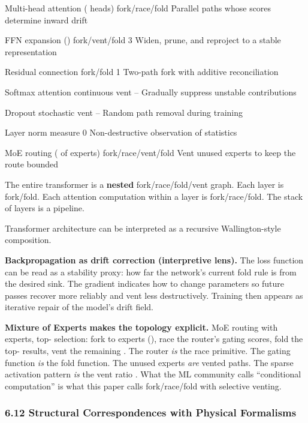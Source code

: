 \documentclass[
]{article}
\begin{document}
Multi-head attention ( heads) \textbar{} fork/race/fold \textbar{}
\textbar{} Parallel paths whose scores determine inward drift \textbar{}

FFN expansion () \textbar{} fork/vent/fold \textbar{} 3 \textbar{}
Widen, prune, and reproject to a stable representation \textbar{}

Residual connection \textbar{} fork/fold \textbar{} 1 \textbar{}
Two-path fork with additive reconciliation \textbar{}

Softmax attention \textbar{} continuous vent \textbar{} -- \textbar{}
Gradually suppress unstable contributions \textbar{}

Dropout \textbar{} stochastic vent \textbar{} -- \textbar{} Random path
removal during training \textbar{}

Layer norm \textbar{} measure \textbar{} 0 \textbar{} Non-destructive
observation of statistics \textbar{}

MoE routing ( of experts) \textbar{} fork/race/vent/fold \textbar{}
\textbar{} Vent unused experts to keep the route bounded \textbar{}

The entire transformer is a \textbf{nested} fork/race/fold/vent graph.
Each layer is fork/fold. Each attention computation within a layer is
fork/race/fold. The stack of layers is a pipeline.

Transformer architecture can be interpreted as a recursive
Wallington-style composition.

\textbf{Backpropagation as drift correction (interpretive lens).} The
loss function can be read as a stability proxy: how far the network's
current fold rule is from the desired sink. The gradient indicates how
to change parameters so future passes recover more reliably and vent
less destructively. Training then appears as iterative repair of the
model's drift field.

\textbf{Mixture of Experts makes the topology explicit.} MoE routing
with experts, top- selection: fork to experts (), race the router's
gating scores, fold the top- results, vent the remaining . The router
\emph{is} the race primitive. The gating function \emph{is} the fold
function. The unused experts \emph{are} vented paths. The sparse
activation pattern \emph{is} the vent ratio . What the ML community
calls ``conditional computation'' is what this paper calls
fork/race/fold with selective venting.

\subsubsection{\texorpdfstring{\textbf{6.12 Structural Correspondences
with Physical
Formalisms}}{6.12 Structural Correspondences with Physical Formalisms}}\label{structural-correspondences-with-physical-formalisms}
\end{document}
